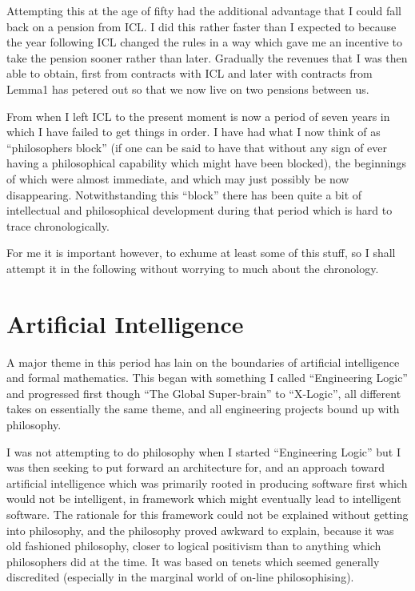 Attempting this at the age of fifty had the additional advantage that I could fall back on a pension from ICL.
I did this rather faster than I expected to because the year following ICL changed the rules in a way which gave me an incentive to take the pension sooner rather than later.
Gradually the revenues that I was then able to obtain, first from contracts with ICL and later with contracts from Lemma1 has petered out so that we now live on two pensions between us.

From when I left ICL to the present moment is now a period of seven years in which I have failed to get things in order.
I have had what I now think of as ``philosophers block'' (if one can be said to have that without any sign of ever having a philosophical capability which might have been blocked), the beginnings of which were almost immediate, and which may just possibly be now disappearing.
Notwithstanding this ``block'' there has been quite a bit of intellectual and philosophical development during that period which is hard to trace chronologically.

For me it is important however, to exhume at least some of this stuff, so I shall attempt it in the following without worrying to much about the chronology.

\section{Artificial Intelligence}

A major theme in this period has lain on the boundaries of artificial intelligence and formal mathematics.
This began with something I called ``Engineering Logic'' and progressed first though ``The Global Super-brain'' to ``X-Logic'', all different takes on essentially the same theme, and all engineering projects bound up with philosophy.

I was not attempting to do philosophy when I started ``Engineering Logic'' but I was then seeking to put forward an architecture for, and an approach toward artificial intelligence which was primarily rooted in producing software first which would not be intelligent, in framework which might eventually lead to intelligent software.
The rationale for this framework could not be explained without getting into philosophy, and the philosophy proved awkward to explain, because it was old fashioned philosophy, closer to logical positivism than to anything which philosophers did at the time.
It was based on tenets which seemed generally discredited (especially in the marginal world of on-line philosophising).

